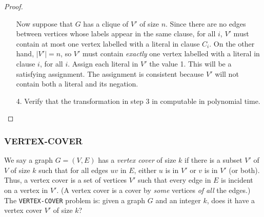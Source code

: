 \documentclass[12pt]{article}
\theoremstyle{plain}
\theoremstyle{definition}
\begin{document}
\begin{proof}
\begin{enumerate}
  Now suppose that $G$ has a clique of $V'$ of size $n$.
  Since there are no edges between vertices whose labels appear in the same clause, for all $i$, $V'$ must contain at most one vertex labelled with a literal in clause $C_{i}$.
  On the other hand, $|V'| = n$, so $V'$ must contain \emph{exactly} one vertex labelled with a literal in clause $i$, for all $i$.
  Assign each literal in $V'$ the value 1.
  This will be a satisfying assignment.
  The assignment is consistent because $V'$ will not contain both a literal and its negation.

  \item[4.] Verify that the transformation in step 3 in computable in polynomial time.
\end{enumerate}
\end{proof}

\subsubsection{VERTEX-COVER}
We say a graph $G = (V, E)$ has a \emph{vertex cover} of size $k$ if there is a subset $V'$ of $V$ of size $k$ such that for all edges $uv$ in $E$, either $u$ is in $V'$ or $v$ is in $V'$ (or both).
Thus, a vertex cover is a set of vertices $V'$ such that every edge in $E$ is incident on a vertex in $V'$. (A vertex cover is a cover by \emph{some} vertices \emph{of all} the edges.) \\

The \texttt{VERTEX-COVER} problem is: given a graph $G$ and an integer $k$, does it have a vertex cover $V'$ of size $k$?
\end{document}
